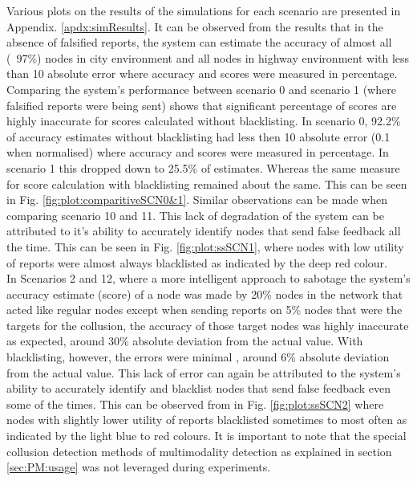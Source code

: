\documentclass[journal]{IEEEtran}
\begin{document}
Various plots on the results of the simulations for each scenario are presented in Appendix. \ref{apdx:simResults}. It can be observed from the results that in the absence of falsified reports, the system can estimate the accuracy of almost all (~97\%) nodes in city environment and all nodes in highway environment with less than 10 absolute error where accuracy and scores were measured in percentage.\\
Comparing the system's performance between scenario 0 and scenario 1 (where falsified reports were being sent) shows that significant percentage of scores are highly inaccurate for scores calculated without blacklisting. In scenario 0, 92.2\% of accuracy estimates without blacklisting had less then 10 absolute error (0.1 when normalised) where accuracy and scores were measured in percentage. In scenario 1 this dropped down to 25.5\% of estimates. Whereas the same measure for score calculation with blacklisting remained about the same. This can be seen in Fig. \ref{fig:plot:comparitiveSCN0&1}. Similar observations can be made when comparing scenario 10 and 11. This lack of degradation of the system can be attributed to it's ability to accurately identify nodes that send false feedback all the time. This can be seen in Fig. \ref{fig:plot:ssSCN1}, where nodes with low utility of reports were almost always blacklisted as indicated by the deep red colour.\\
In Scenarios 2 and 12, where a more intelligent approach to sabotage the system's accuracy estimate (score) of a node was made by 20\% nodes in the network that acted like regular nodes except when sending reports on 5\% nodes that were the targets for the collusion, the accuracy of those target nodes was highly inaccurate as expected, %
around 30\% absolute deviation from the actual value.
With blacklisting, however, the errors were minimal %
, around 6\% absolute deviation from the actual value. This lack of error can again be attributed to the system's ability to accurately identify and blacklist nodes that send false feedback even some of the times. This can be observed from in Fig. \ref{fig:plot:ssSCN2} where nodes with slightly lower utility of reports blacklisted sometimes to most often as indicated by the light blue to red colours. It is important to note that the special collusion detection methods of multimodality detection\cite{c:DipTest}\cite{c:SilvermansTest} as explained in section \ref{sec:PM:usage} was not leveraged during experiments.
\end{document}

